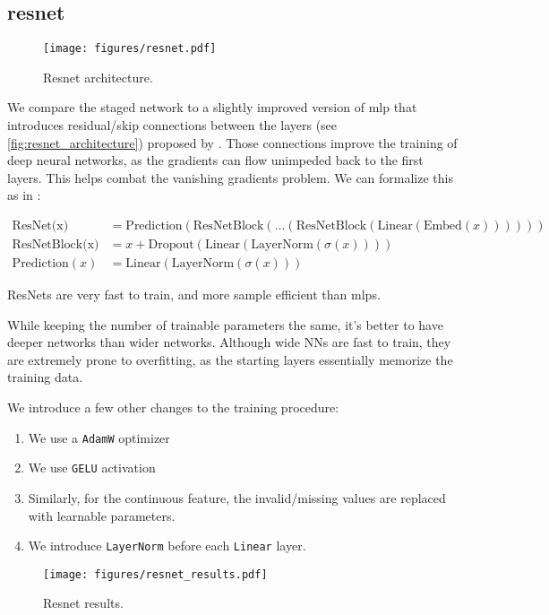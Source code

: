 \subsection[resnet]{\gls{resnet}}
\label{sec:resnet}

\begin{figure}[htbp]
    \centering
    \texttt{[image: figures/resnet.pdf]}
    \caption{Resnet architecture.}
    \label{fig:resnet_architecture}
\end{figure}

We compare the staged network to a slightly improved version of \gls{mlp} that introduces residual/skip
connections between the layers (see \autoref{fig:resnet_architecture}) proposed by \cite{resnet}.
Those connections improve the training of deep neural networks, as the gradients can flow unimpeded back to the first
layers. This helps combat the vanishing gradients problem. We can formalize this as in
\cite{ft-transformer}:


{\fontsize{11}{10}\selectfont
\begin{align}
    \text{ResNet(x)}      & = \text{Prediction}(\text{ResNetBlock}(\dots(\text{ResNetBlock}(\text{Linear}(\text{Embed}(x)))))) \\
    \text{ResNetBlock(x)} & = x + \text{Dropout}(\text{Linear}(\text{LayerNorm}(\sigma(x))))                                   \\
    \text{Prediction}(x)  & = \text{Linear}(\text{LayerNorm}(\sigma(x)))
\end{align}
}

ResNets are very fast to train, and more sample efficient than \glspl{mlp}.


While keeping the number of trainable parameters the same, it's better to have deeper networks than wider networks.
Although wide NNs are fast to train, they are extremely prone to overfitting, as the starting layers essentially
memorize the training data.


We introduce a few other changes to the training procedure:

\begin{enumerate}
    \item We use a \verb|AdamW| optimizer \cite{adamw}
    \item We use \verb|GELU| activation \cite{gelu}
    \item Similarly, for the continuous feature, the invalid/missing values are replaced with learnable parameters.
    \item We introduce \verb|LayerNorm| \cite{layernorm} before each \verb|Linear| layer.
\end{enumerate}

\begin{figure}[htbp]
    \centering
    \texttt{[image: figures/resnet\_results.pdf]}
    \caption{Resnet results.}
    \label{fig:resnet_results}
\end{figure}


